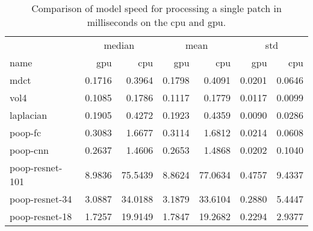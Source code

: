 \begin{table}[ht]
    \centering
    \caption{Comparison of model speed for processing a single patch in milliseconds on the \ac{cpu} and \ac{gpu}.}
    \label{tab:Results:Computation:Speed}
    \begin{tabular}{|l|rr|rr|rr|}
        \hline
        \multicolumn{1}{|c|}{} & \multicolumn{2}{c|}{median} & \multicolumn{2}{c|}{mean} & \multicolumn{2}{c|}{std} \\
        name & \acs{gpu} & \acs{cpu} & \acs{gpu} & \acs{cpu} & \acs{gpu} & \acs{cpu} \\
        \hline
        \acs{mdct}      & 0.1716 &  0.3964 & 0.1798 &  0.4091 & 0.0201 & 0.0646 \\
        \acs{vol4}      & 0.1085 &  0.1786 & 0.1117 &  0.1779 & 0.0117 & 0.0099 \\
        \acs{laplacian} & 0.1905 &  0.4272 & 0.1923 &  0.4359 & 0.0090 & 0.0286 \\
        \hline
        \acs{poop}-\acs{fc}  & 0.3083 &  1.6677 & 0.3114 &  1.6812 & 0.0214 & 0.0608 \\
        \acs{poop}-\acs{cnn}            & 0.2637 &  1.4606 & 0.2653 &  1.4868 & 0.0202 & 0.1040 \\
        \acs{poop}-\acs{resnet}-101      & 8.9836 & 75.5439 & 8.8624 & 77.0634 & 0.4757 & 9.4337 \\
        \acs{poop}-\acs{resnet}-34       & 3.0887 & 34.0188 & 3.1879 & 33.6104 & 0.2880 & 5.4447 \\
        \acs{poop}-\acs{resnet}-18       & 1.7257 & 19.9149 & 1.7847 & 19.2682 & 0.2294 & 2.9377 \\
        \hline
    \end{tabular}
\end{table}



